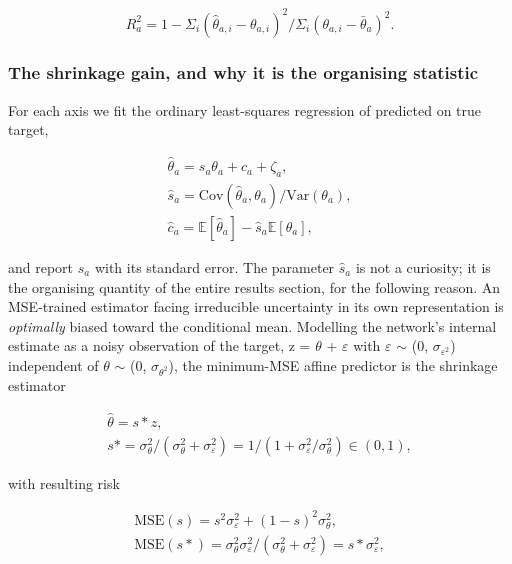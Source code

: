 \begin{equation}
\label{eq:153}
R^{2}_a = 1 - \Sigma _i ( \hat{\theta }_{a,i} - \theta _{a,i} )^{2} / \Sigma _i ( \theta _{a,i} - \bar{\theta }_a )^{2} .
\end{equation}

\subsubsection{The shrinkage gain, and why it is the organising statistic}

For each axis we fit the ordinary least-squares regression of predicted on true target,

\begin{equation}
\label{eq:154}
\begin{aligned}
\hat{\theta }_a = s_a \theta _a + c_a + \zeta _a , \\
\hat{s}_a = \mathrm{Cov}( \hat{\theta }_a, \theta _a ) / \mathrm{Var}( \theta _a ) , \\
\hat{c}_a = \mathbb{E}[\hat{\theta }_a] - \hat{s}_a \mathbb{E}[\theta _a] ,
\end{aligned}
\end{equation}

and report $\hat{s}_{a}$ with its standard error. The parameter $\hat{s}_{a}$ is not a curiosity; it is the organising quantity of the entire results section, for the following reason. An MSE-trained estimator facing irreducible uncertainty in its own representation is \emph{optimally} biased toward the conditional mean. Modelling the network's internal estimate as a noisy observation of the target, z = $\theta$ + $\varepsilon$ with $\varepsilon$ $\sim$ (0, $\sigma_{\varepsilon^{2}}$) independent of $\theta$ $\sim$ (0, $\sigma_{\theta^{2}}$), the minimum-MSE affine predictor is the shrinkage estimator 

\begin{equation}
\label{eq:155}
\begin{aligned}
\hat{\theta } = s* z , \\
s* = \sigma _{\theta} ^{2} / ( \sigma _{\theta} ^{2} + \sigma _{\varepsilon} ^{2} ) = 1 / ( 1 + \sigma _{\varepsilon} ^{2}/\sigma _{\theta} ^{2} ) \in (0,1) ,
\end{aligned}
\end{equation}

with resulting risk

\begin{equation}
\label{eq:156}
\begin{aligned}
\mathrm{MSE}(s) = s^{2} \sigma _{\varepsilon} ^{2} + (1 - s)^{2} \sigma _{\theta} ^{2} , \\
\mathrm{MSE}(s*) = \sigma _{\theta} ^{2} \sigma _{\varepsilon} ^{2} / ( \sigma _{\theta} ^{2} + \sigma _{\varepsilon} ^{2} ) = s* \sigma _{\varepsilon} ^{2} ,
\end{aligned}
\end{equation}

